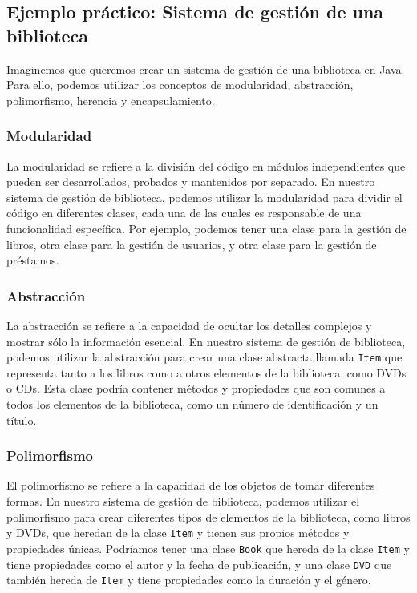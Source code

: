 \documentclass[executivepaper]{article}
\begin{document}
\subsection{Ejemplo práctico: Sistema de gestión de una biblioteca}

Imaginemos que queremos crear un sistema de gestión de una biblioteca en Java. Para ello, podemos utilizar los conceptos de modularidad, abstracción, polimorfismo, herencia y encapsulamiento.

\subsubsection{Modularidad}

La modularidad se refiere a la división del código en módulos independientes que pueden ser desarrollados, probados y mantenidos por separado. En nuestro sistema de gestión de biblioteca, podemos utilizar la modularidad para dividir el código en diferentes clases, cada una de las cuales es responsable de una funcionalidad específica. Por ejemplo, podemos tener una clase para la gestión de libros, otra clase para la gestión de usuarios, y otra clase para la gestión de préstamos.

\subsubsection*{Abstracción}

La abstracción se refiere a la capacidad de ocultar los detalles complejos y mostrar sólo la información esencial. En nuestro sistema de gestión de biblioteca, podemos utilizar la abstracción para crear una clase abstracta llamada \texttt{Item} que representa tanto a los libros como a otros elementos de la biblioteca, como DVDs o CDs. Esta clase podría contener métodos y propiedades que son comunes a todos los elementos de la biblioteca, como un número de identificación y un título.

\subsubsection*{Polimorfismo}

El polimorfismo se refiere a la capacidad de los objetos de tomar diferentes formas. En nuestro sistema de gestión de biblioteca, podemos utilizar el polimorfismo para crear diferentes tipos de elementos de la biblioteca, como libros y DVDs, que heredan de la clase \texttt{Item} y tienen sus propios métodos y propiedades únicas. Podríamos tener una clase \texttt{Book} que hereda de la clase \texttt{Item} y tiene propiedades como el autor y la fecha de publicación, y una clase \texttt{DVD} que también hereda de \texttt{Item} y tiene propiedades como la duración y el género.
\end{document}
